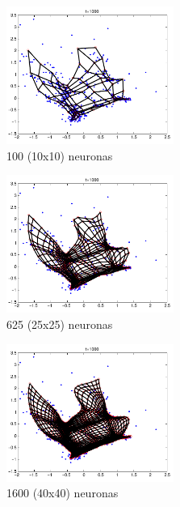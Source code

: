 \documentclass[informe.tex]{subfiles}
\begin{document}
      \begin{minipage}{0.33\textwidth}
	\centering
	\begin{figure}[H]
	  \centering
	  \includegraphics[height=4.5cm,keepaspectratio]{graficos/malla/10x10.png}
                \caption{\small 100 (10x10) neuronas}
	\end{figure}
	
	\begin{figure}[H]
	  \centering
	  \includegraphics[height=4.5cm,keepaspectratio]{graficos/malla/25x25.png}
                \caption{\small 625 (25x25) neuronas}
	\end{figure}
	
	\begin{figure}[H]
	  \centering
	  \includegraphics[height=4.5cm,keepaspectratio]{graficos/malla/40x40.png}
                \caption{\small 1600 (40x40) neuronas}
	\end{figure}
      \end{minipage}
\end{document}
